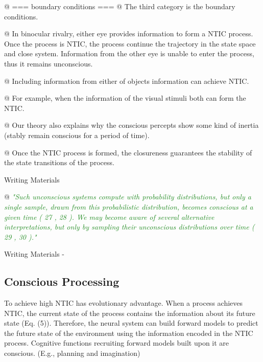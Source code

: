 \documentclass[utf8]{article}
\newenvironment{ants}
			{
			 \begin{easylist}[itemize]
		 	}
			{
			\end{easylist}
			} %
\newenvironment{WritingMaterials} %
    	{
            \begin{tcolorbox}[enhanced,
                title=-,
                size=small,
                colbacktitle=Aquamarine,
                drop fuzzy shadow,
                fontupper=\small,
                boxrule=0.4pt,
                colback=Aquamarine!10!white,
                sharp corners]
                Writing Materials
            \end{tcolorbox}
            \begin{easylist}[itemize]
    	}
    	{
            \end{easylist}  
            \begin{tcolorbox}[enhanced,
                halign=flush right,
                halign title=right,
                size=small,
                colbacktitle=Aquamarine,
                drop fuzzy shadow,
                fontupper=\small,
                boxrule=0.4pt,
                colback=Aquamarine,
                colupper=White,
                sharp corners]
                Writing Materials -
            \end{tcolorbox}        
    	}
\newcommand{\rewrite}[1]{\textcolor{ForestGreen}{\textit{"#1"}}\newline}
\begin{document}
\begin{ants}
        	   @  === boundary conditions  ===
        	   @ The third category is the boundary conditions. 
        	   
        	   @ In binocular rivalry, either eye provides information to form a NTIC process. Once the process is NTIC, the process continue the trajectory in the state space and close system. Information from the other eye is unable to enter the process, thus it remains unconscious. 
        	   
        	   @ Including information from either of objects information can achieve NTIC. 
        	   
        	   @ For example, when the information of the visual stimuli both can form the NTIC.
        	   
        	   @ Our theory also explains why the conscious percepts show some kind of inertia (stably remain conscious for a period of time). 
        	   
        	   @ Once the NTIC process is formed, the closureness guarantees the stability of the state transitions of the process. 
                
            \end{ants}
        
        
        
            \begin{WritingMaterials}
            
                @ \rewrite{Such unconscious systems compute with probability distributions, but only a single sample, drawn from this probabilistic distribution, becomes conscious at a given time ( 27 , 28 ). We may become aware of several alternative interpretations, but only by sampling their unconscious distributions over time ( 29 , 30 ).}
            
            \end{WritingMaterials}


\rlends
		
		\subsection{Conscious Processing}
		
		To achieve high NTIC has evolutionary advantage. When a process achieves NTIC, the current state of the process contains the information about its future state (Eq. (5)). Therefore, the neural system can build forward models to predict the future state of the environment using the information encoded in the NTIC process. Cognitive functions recruiting forward models built upon it are conscious. (E.g., planning and imagination)
		
\end{document}
